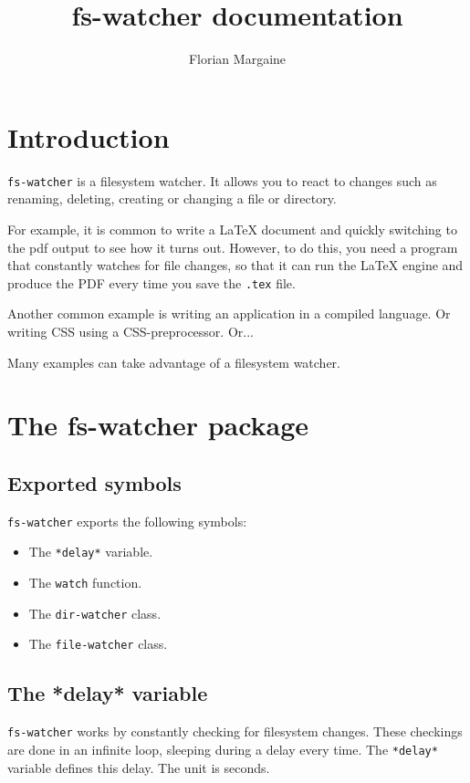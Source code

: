 \documentclass[a4paper]{report}
\title{fs-watcher documentation}
\author{Florian Margaine}
\date{}
\newcommand{\code}{\texttt}
\begin{document}
\maketitle

\tableofcontents

\chapter{Introduction}

\code{fs-watcher} is a filesystem watcher. It allows you to react to changes
such as renaming, deleting, creating or changing a file or directory.

For example, it is common to write a \LaTeX{} document and quickly switching
to the pdf output to see how it turns out. However, to do this, you need a
program that constantly watches for file changes, so that it can run the
\LaTeX{} engine and produce the PDF every time you save the \code{.tex} file.

Another common example is writing an application in a compiled language. Or
writing CSS using a CSS-preprocessor. Or...

Many examples can take advantage of a filesystem watcher.

\chapter{The fs-watcher package}

\section{Exported symbols}

\code{fs-watcher} exports the following symbols:

\begin{itemize}
    \item The \code{*delay*} variable.
    \item The \code{watch} function.
    \item The \code{dir-watcher} class.
    \item The \code{file-watcher} class.
\end{itemize}

\section{The *delay* variable}

\code{fs-watcher} works by constantly checking for filesystem changes. These
checkings are done in an infinite loop, sleeping during a delay every time. The
\code{*delay*} variable defines this delay. The unit is seconds.
\end{document}
